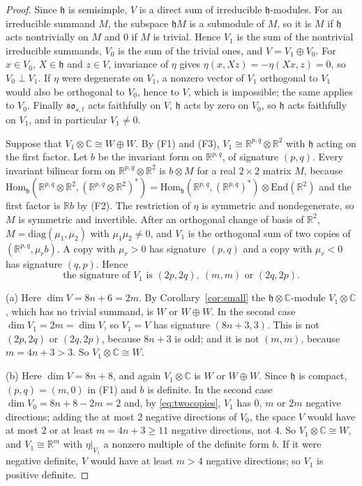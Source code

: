 \documentclass[11pt]{amsart}
\theoremstyle{remark}
\newcommand{\so}{\mathfrak{so}}
\newcommand{\h}{\mathfrak{h}}
\newcommand{\R}{\mathbb{R}}
\newcommand{\C}{\mathbb{C}}
\begin{document}
\begin{proof}
Since $\h$ is semisimple, $V$ is a direct sum of irreducible $\h$-modules. For an irreducible summand $M$, the subspace $\h M$ is a submodule of $M$, so it is $M$ if $\h$ acts nontrivially on $M$ and $0$ if $M$ is trivial. Hence $V_1$ is the sum of the nontrivial irreducible summands, $V_0$ is the sum of the trivial ones, and $V=V_1\oplus V_0$. For $x\in V_0$, $X\in\h$ and $z\in V$, invariance of $\eta$ gives $\eta(x,Xz)=-\eta(Xx,z)=0$, so $V_0\perp V_1$. If $\eta$ were degenerate on $V_1$, a nonzero vector of $V_1$ orthogonal to $V_1$ would also be orthogonal to $V_0$, hence to $V$, which is impossible; the same applies to $V_0$. Finally $\so_{s,t}$ acts faithfully on $V$, $\h$ acts by zero on $V_0$, so $\h$ acts faithfully on $V_1$, and in particular $V_1\ne0$.

Suppose that $V_1\otimes\C\cong W\oplus W$. By (F1) and (F3), $V_1\cong\R^{p,q}\otimes\R^2$ with $\h$ acting on the first factor. Let $b$ be the invariant form on $\R^{p,q}$, of signature $(p,q)$. Every invariant bilinear form on $\R^{p,q}\otimes\R^2$ is $b\otimes M$ for a real $2\times2$ matrix $M$, because $\mathrm{Hom}_\h(\R^{p,q}\otimes\R^2,(\R^{p,q}\otimes\R^2)^*)=\mathrm{Hom}_\h(\R^{p,q},(\R^{p,q})^*)\otimes\mathrm{End}(\R^2)$ and the first factor is $\R b$ by (F2). The restriction of $\eta$ is symmetric and nondegenerate, so $M$ is symmetric and invertible. After an orthogonal change of basis of $\R^2$, $M=\mathrm{diag}(\mu_1,\mu_2)$ with $\mu_1\mu_2\ne0$, and $V_1$ is the orthogonal sum of two copies of $(\R^{p,q},\mu_rb)$. A copy with $\mu_r>0$ has signature $(p,q)$ and a copy with $\mu_r<0$ has signature $(q,p)$. Hence
\begin{equation}\label{eq:twocopies}
\text{the signature of }V_1\text{ is }(2p,2q),\ (m,m)\text{ or }(2q,2p).
\end{equation}

(a) Here $\dim V=8n+6=2m$. By Corollary~\ref{cor:small} the $\h\otimes\C$-module $V_1\otimes\C$, which has no trivial summand, is $W$ or $W\oplus W$. In the second case $\dim V_1=2m=\dim V$, so $V_1=V$ has signature $(8n+3,3)$. This is not $(2p,2q)$ or $(2q,2p)$, because $8n+3$ is odd; and it is not $(m,m)$, because $m=4n+3>3$. So $V_1\otimes\C\cong W$.

(b) Here $\dim V=8n+8$, and again $V_1\otimes\C$ is $W$ or $W\oplus W$. Since $\h$ is compact, $(p,q)=(m,0)$ in (F1) and $b$ is definite. In the second case $\dim V_0=8n+8-2m=2$ and, by \eqref{eq:twocopies}, $V_1$ has $0$, $m$ or $2m$ negative directions; adding the at most $2$ negative directions of $V_0$, the space $V$ would have at most $2$ or at least $m=4n+3\ge11$ negative directions, not $4$. So $V_1\otimes\C\cong W$, and $V_1\cong\R^m$ with $\eta|_{V_1}$ a nonzero multiple of the definite form $b$. If it were negative definite, $V$ would have at least $m>4$ negative directions; so $V_1$ is positive definite.


\end{proof}
\end{document}
